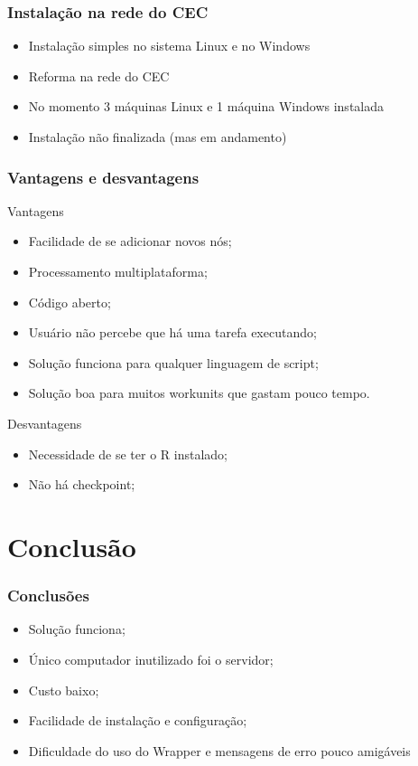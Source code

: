 \documentclass{beamer}
\begin{document}
\begin{frame}
  \frametitle{Instalação na rede do CEC}
  \begin{itemize}
    \item Instalação simples no sistema Linux e no Windows
    \item Reforma na rede do CEC
    \item No momento 3 máquinas Linux e 1 máquina Windows instalada
    \item Instalação não finalizada (mas em andamento)
  \end{itemize}
\end{frame}

\begin{frame}
  \frametitle{Vantagens e desvantagens}
  \begin{block}{Vantagens}
  \begin{itemize}
    \item Facilidade de se adicionar novos nós;
    \item Processamento multiplataforma;
    \item Código aberto;
    \item Usuário não percebe que há uma tarefa executando;
    \item Solução funciona para qualquer linguagem de script;
    \item Solução boa para muitos workunits que gastam pouco tempo.
  \end{itemize}
  \end{block}
  \begin{block}{Desvantagens}
  \begin{itemize}
    \item Necessidade de se ter o R instalado;
    \item Não há checkpoint;
  \end{itemize}
  \end{block}
\end{frame}


\section{Conclusão}

\begin{frame}
  \frametitle{Conclusões}
  \begin{itemize}
    \item Solução funciona;
    \item Único computador inutilizado foi o servidor;
    \item Custo baixo;
    \item Facilidade de instalação e configuração;
    \item Dificuldade do uso do Wrapper e mensagens de erro pouco amigáveis 
  \end{itemize}
\end{frame}
\end{document}
